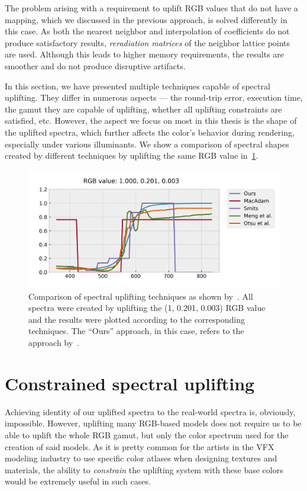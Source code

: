 The problem arising with a requirement to uplift RGB values that do not have a mapping, which we discussed in the previous approach, is solved differently in this case. As both the nearest neighbor and interpolation of coefficients do not produce satisfactory results, \emph{reradiation matrices} of the neighbor lattice points are used. Although this leads to higher memory requirements, the results are smoother and do not produce disruptive artifacts. 

In this section, we have presented multiple techniques capable of spectral uplifting. They differ in numerous aspects --- the round-trip error, execution time, the gamut they are capable of uplifting, whether all uplifting constraints are satisfied, etc. However, the aspect we focus on most in this thesis is the shape of the uplifted spectra, which further affects the color's behavior during rendering, especially under various illuminants. We show a comparison of spectral shapes created by different techniques by uplifting the same RGB value in~\cref{fig:upliftingTechniques}.

\begin{figure}[t!]
	\centering
	\includegraphics[width=0.8\linewidth]{img/upsampling_techniques.png}
	\caption{Comparison of spectral uplifting techniques as shown by~\citet{upsamplingJakobHanika}. All spectra were created by uplifting the (1, 0.201, 0.003) RGB value and the results were plotted according to the corresponding techniques. The ``Ours'' approach, in this case, refers to the approach by~\citet{upsamplingJakobHanika}.}
	\label{fig:upliftingTechniques}
\end{figure}

\section{Constrained spectral uplifting}

Achieving identity of our uplifted spectra to the real-world spectra is, obviously, impossible. However, uplifting many RGB-based models does not require us to be able to uplift the whole RGB gamut, but only the color spectrum used for the creation of said models. As it is pretty common for the artists in the VFX modeling industry to use specific color atlases when designing textures and materials, the ability to \emph{constrain} the uplifting system with these base colors would be extremely useful in such cases.

